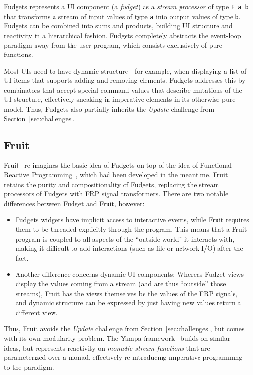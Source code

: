 \documentclass[sigplan,screen]{acmart}
\begin{document}
Fudgets represents a UI component (a \textit{fudget}) as a
\textit{stream processor} of type \verb|F a b| that transforms a
stream of input values of type \texttt{a} into output values of type
\texttt{b}.  Fudgets can be combined into sums and products, building
UI structure and reactivity in a hierarchical fashion.  Fudgets
completely abstracts the event-loop paradigm away from the user
program, which consists exclusively of pure functions.

Most UIs
need to have dynamic structure---for example, when
displaying a list of UI items that supports adding and removing
elements.  Fudgets addresses this by combinators that accept special
command values that describe mutations of the UI structure,
effectively sneaking in imperative elements in its otherwise pure
model.  Thus, Fudgets also partially inherits the \hyperlink{challenge:update}{\textit{Update}} challenge from
Section~\ref{sec:challenges}.

\subsection{Fruit}

Fruit~\cite{Fruit} re-imagines the basic idea of Fudgets on top of the
idea of Functional-Reactive Programming~\cite{FRP}, which had been
developed in the meantime.  Fruit retains the purity and
compositionality of Fudgets,  replacing the stream processors of
Fudgets with FRP signal transformers.  There are two notable
differences between Fudget and Fruit, however:
\begin{itemize}
\item Fudgets widgets have implicit access to interactive events,
  while Fruit requires them to be threaded explicitly through the
  program.  This means that a Fruit program is coupled to all aspects
  of the ``outside world'' it interacts with, making it difficult to
  add interactions (such as file or network I/O) after
  the fact.
\item Another difference concerns dynamic UI components:
  Whereas Fudget views display the values coming from a
  stream (and are thus ``outside'' those streams), Fruit has the views
  themselves be the values of the FRP signals, and dynamic structure
  can be expressed by just having new values return a different view.
\end{itemize}
%
Thus, Fruit avoids the \hyperlink{challenge:update}{\textit{Update}} challenge from Section~\ref{sec:challenges},
but comes with its own modularity problem.  The Yampa framework~\cite{Yampa} builds
on similar ideas, but represents reactivity on \textit{monadic stream
  functions} that are parameterized over a monad, effectively re-introducing
imperative programming to the paradigm.
\end{document}

